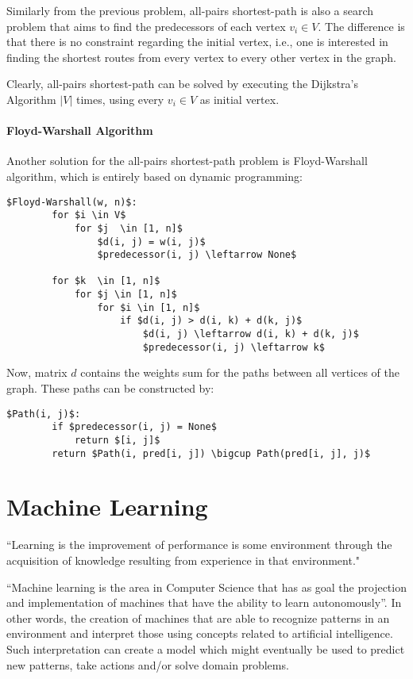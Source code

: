 Similarly from the previous problem, all-pairs shortest-path is also a search problem that aims to find the predecessors of each vertex $v_i \in V$. The difference is that there is no constraint regarding the initial vertex, i.e., one is interested in finding the shortest routes from every vertex to every other vertex in the graph.

Clearly, all-pairs shortest-path can be solved by executing the Dijkstra's Algorithm $|V|$ times, using every $v_i \in V$ as initial vertex.

\paragraph{Floyd-Warshall Algorithm \cite{golin2003floydwarshall}}

Another solution for the all-pairs shortest-path problem is Floyd-Warshall algorithm, which is entirely based on dynamic programming:

\begin{lstlisting}[mathescape]
    $Floyd-Warshall(w, n)$:
        for $i \in V$
            for $j  \in [1, n]$
                $d(i, j) = w(i, j)$
                $predecessor(i, j) \leftarrow None$

        for $k  \in [1, n]$
            for $j \in [1, n]$
                for $i \in [1, n]$
                    if $d(i, j) > d(i, k) + d(k, j)$
                        $d(i, j) \leftarrow d(i, k) + d(k, j)$
                        $predecessor(i, j) \leftarrow k$
\end{lstlisting}

Now, matrix $d$ contains  the weights sum for the paths between all vertices of the graph. These paths can be constructed by:
\begin{lstlisting}[mathescape]
    $Path(i, j)$:
        if $predecessor(i, j) = None$
            return $[i, j]$
        return $Path(i, pred[i, j]) \bigcup Path(pred[i, j], j)$
\end{lstlisting}

\section{Machine Learning}
“Learning is the improvement of performance is some environment through the acquisition of knowledge resulting from experience in that environment." \cite{pat1996}

“Machine learning is the area in Computer Science that has as goal the projection and implementation of machines that have the ability to learn autonomously”. \cite{hot2009} In other words, the creation of machines that are able to recognize patterns in an environment and interpret those using concepts related to artificial intelligence. Such interpretation can create a model which might eventually be used to predict new patterns, take actions and/or solve domain problems.

